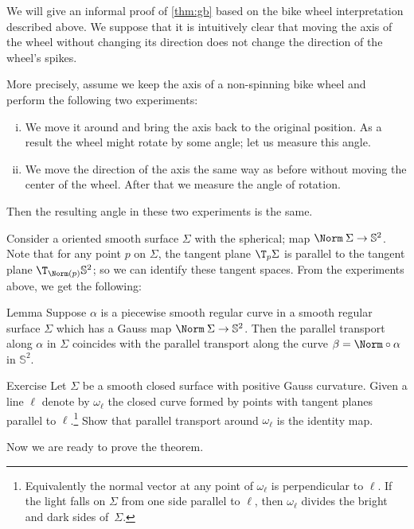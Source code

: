 \medskip

We will give an informal proof of \ref{thm:gb} based on the bike wheel interpretation described above.
We suppose that it is intuitively clear that moving the axis of the wheel without changing its direction does not change the direction of the wheel's spikes.

More precisely, assume we keep the axis of a non-spinning bike wheel and perform the following two experiments:
\begin{enumerate}[(i)]
\item We move it around and bring the axis back to the original position. 
As a result the wheel might rotate by some angle; let us measure this angle.

\item
We move the direction of the axis the same way as before without moving the center of the wheel.
After that we measure the angle of rotation.
\end{enumerate}
Then the resulting angle in these two experiments is the same. 

Consider a oriented smooth surface $\Sigma$ with the spherical; map $\Norm\:\Sigma\to \mathbb{S}^2$.
Note that for any point $p$ on $\Sigma$, the tangent plane $\T_p\Sigma$ is parallel to the tangent plane $\T_{\Norm(p)}\mathbb{S}^2$; so we can identify these tangent spaces.
From the experiments above, we get the following:

\begin{thm}{Lemma}\label{lem:spherical-image}
Suppose $\alpha$ is a piecewise smooth regular curve in a smooth regular surface $\Sigma$ which has a Gauss map $\Norm\:\Sigma\to \mathbb{S}^2$.
Then the parallel transport along $\alpha$ in $\Sigma$ coincides with the parallel transport along the curve $\beta=\Norm\circ\alpha$ in $\mathbb{S}^2$.
\end{thm}

\begin{thm}{Exercise}
Let $\Sigma$ be a smooth closed surface with positive Gauss curvature.
Given a line $\ell$ denote by $\omega_\ell$ the closed curve formed by points with tangent planes parallel to $\ell$.\footnote{Equivalently the normal vector at any point of $\omega_\ell$ is perpendicular to $\ell$. If the light falls on $\Sigma$ from one side parallel to $\ell$, then $\omega_\ell$ divides the bright and dark sides of~$\Sigma$.}
Show that parallel transport around $\omega_\ell$ is the identity map.
\end{thm}

Now we are ready to prove the theorem.

